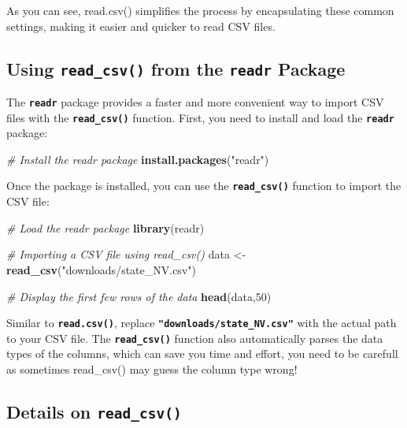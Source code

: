 \documentclass[
]{book}
\newenvironment{Shaded}{\begin{snugshade}}{\end{snugshade}}
\newcommand{\CommentTok}[1]{\textcolor[rgb]{0.56,0.35,0.01}{\textit{#1}}}
\newcommand{\DecValTok}[1]{\textcolor[rgb]{0.00,0.00,0.81}{#1}}
\newcommand{\FunctionTok}[1]{\textcolor[rgb]{0.13,0.29,0.53}{\textbf{#1}}}
\newcommand{\NormalTok}[1]{#1}
\newcommand{\OtherTok}[1]{\textcolor[rgb]{0.56,0.35,0.01}{#1}}
\newcommand{\StringTok}[1]{\textcolor[rgb]{0.31,0.60,0.02}{#1}}
\begin{document}
As you can see, read.csv() simplifies the process by encapsulating these common settings, making it easier and quicker to read CSV files.

\subsection{\texorpdfstring{Using \texttt{read\_csv()} from the \texttt{readr} Package}{Using read\_csv() from the readr Package}}\label{using-read_csv-from-the-readr-package}

The \textbf{\texttt{readr}} package provides a faster and more convenient way to import CSV files with the \textbf{\texttt{read\_csv()}} function. First, you need to install and load the \textbf{\texttt{readr}} package:

\begin{Shaded}
\begin{Highlighting}[]
\CommentTok{\# Install the readr package}
\FunctionTok{install.packages}\NormalTok{(}\StringTok{"readr"}\NormalTok{)}
\end{Highlighting}
\end{Shaded}

Once the package is installed, you can use the \textbf{\texttt{read\_csv()}} function to import the CSV file:

\begin{Shaded}
\begin{Highlighting}[]
\CommentTok{\# Load the readr package}
\FunctionTok{library}\NormalTok{(readr)}

\CommentTok{\# Importing a CSV file using read\_csv()}
\NormalTok{data }\OtherTok{\textless{}{-}} \FunctionTok{read\_csv}\NormalTok{(}\StringTok{"downloads/state\_NV.csv"}\NormalTok{)}

\CommentTok{\# Display the first few rows of the data}
\FunctionTok{head}\NormalTok{(data,}\DecValTok{50}\NormalTok{)}
\end{Highlighting}
\end{Shaded}

Similar to \textbf{\texttt{read.csv()}}, replace \textbf{\texttt{"downloads/state\_NV.csv"}} with the actual path to your CSV file. The \textbf{\texttt{read\_csv()}} function also automatically parses the data types of the columns, which can save you time and effort, {you need to be carefull as sometimes read\_csv() may guess the column type wrong!}

\subsection*{\texorpdfstring{Details on \texttt{read\_csv()}}{Details on read\_csv()}}\label{details-on-read_csv}
\end{document}
